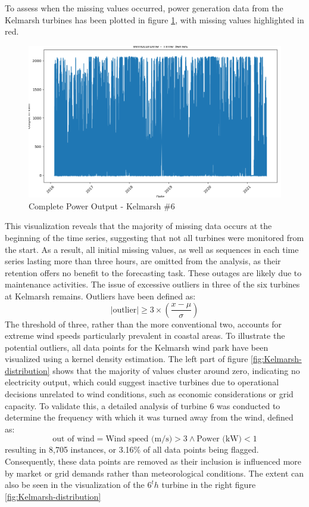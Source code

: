 \documentclass{article}
\begin{document}
To assess when the missing values occurred, power generation data from the Kelmarsh turbines has been plotted in figure \ref{fig:Kelmarsh-missing-values}, with missing values highlighted in red. 

\begin{figure}
    \centering
    \includegraphics[width=\linewidth]{graphs/data/Windturbine - Time Series.png}
    \caption{Complete Power Output - Kelmarsh \#6}
    \label{fig:Kelmarsh-missing-values}
\end{figure}

This visualization reveals that the majority of missing data occurs at the beginning of the time series, suggesting that not all turbines were monitored from the start. As a result, all initial missing values, as well as sequences in each time series lasting more than three hours, are omitted from the analysis, as their retention offers no benefit to the forecasting task. These outages are likely due to maintenance activities. The issue of excessive outliers in three of the six turbines at Kelmarsh remains. Outliers have been defined as:
\begin{equation}
    |\text{outlier}| \geq 3 \times \left( \frac{x - \mu}{\sigma} \right)
\end{equation}
The threshold of three, rather than the more conventional two, accounts for extreme wind speeds particularly prevalent in coastal areas. To illustrate the potential outliers, all data points for the Kelmarsh wind park have been visualized using a kernel density estimation. The left part of figure \ref{fig:Kelmarsh-distribution} shows that the majority of values cluster around zero, indicating no electricity output, which could suggest inactive turbines due to operational decisions unrelated to wind conditions, such as economic considerations or grid capacity. To validate this, a detailed analysis of turbine 6 was conducted to determine the frequency with which it was turned away from the wind, defined as:
\begin{equation}
    \text{out of wind} = \text{Wind speed (m/s)} > 3 \land \text{Power (kW)} < 1 
\end{equation}
resulting in 8,705 instances, or 3.16\% of all data points being flagged. Consequently, these data points are removed as their inclusion is influenced more by market or grid demands rather than meteorological conditions. The extent can also be seen in the visualization of the $6^th$ turbine in the right figure \ref{fig:Kelmarsh-distribution}
\end{document}
